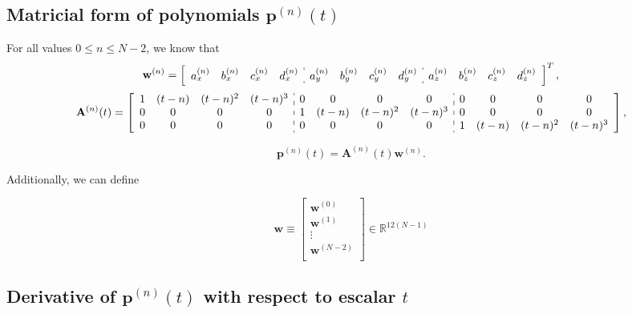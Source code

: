\subsection{Matricial form of polynomials $\mathbf{p}^{(n)}(t)$}
For all values $0\leq n \leq N-2$, we know that
\begin{equation}
\mathbf{w}^{(n)}=
\left[
\begin{array}{cccc:cccc:cccc}
a_{x}^{(n)} & b_{x}^{(n)} & c_{x}^{(n)} & d_{x}^{(n)} & 
a_{y}^{(n)} & b_{y}^{(n)} & c_{y}^{(n)} & d_{y}^{(n)} & 
a_{z}^{(n)} & b_{z}^{(n)} & c_{z}^{(n)} & d_{z}^{(n)}
\end{array}
\right]^{T},
\end{equation}
\small
\begin{equation}\label{eq:Ant}
\mathbf{A}^{(n)}(t)=
\left[
\begin{array}{cccc:cccc:cccc}
1 & (t-n) & (t-n)^{2} & (t-n)^{3} &
0 & 0 & 0 & 0 &
0 & 0 & 0 & 0 \\
0 & 0 & 0 & 0 &
1 & (t-n) & (t-n)^{2} & (t-n)^{3} &
0 & 0 & 0 & 0 \\
0 & 0 & 0 & 0 &
0 & 0 & 0 & 0 &
1 & (t-n) & (t-n)^{2} & (t-n)^{3} 
\end{array}
\right],
\end{equation}
\normalsize

\begin{equation}\label{eq:primeder0}
\mathbf{p}^{(n)}(t)=
\mathbf{A}^{(n)}(t) \mathbf{w}^{(n)}.
\end{equation}

Additionally, we can define

\begin{equation}\label{eq:wvector}
\mathbf{w}
\equiv
\begin{bmatrix}
\mathbf{w}^{(0)}\\
\mathbf{w}^{(1)}\\
\vdots\\
\mathbf{w}^{(N-2)}\\
\end{bmatrix}
\in \mathbb{R}^{12(N-1)}
\end{equation}

\subsection{Derivative of $\mathbf{p}^{(n)}(t)$ with respect to escalar $t$}

